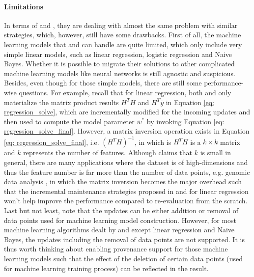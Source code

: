 \paragraph{Limitations} In terms of \cite{deshpande2006mauvedb} and \cite{gupta2015processing}, they are dealing with almost the same problem with similar strategies, which, however, still have some drawbacks. First of all, the machine learning models that \cite{deshpande2006mauvedb} and \cite{gupta2015processing} can handle are quite limited, which only include very simple linear models, such as linear regression, logistic regression and Naive Bayes. Whether it is possible to migrate their solutions to other complicated machine learning models like neural networks is still agnostic and suspicious. Besides, even though for those simple models, there are still some performance-wise questions. For example, recall that for linear regression, both \cite{deshpande2006mauvedb} and \cite{gupta2015processing} only materialize the matrix product results $H^TH$ and $H^T\bar{y}$ in Equation \ref{eq: regression_solve}, which are incrementally modified for the incoming updates and then used to compute the model parameter $\bar{w}^*$ by invoking Equation \ref{eq: regression_solve_final}. However, a matrix inversion operation exists in Equation \ref{eq: regression_solve_final}, i.e. $(H^TH)^{-1}$, in which is $H^TH$ is a $k\times k$ matrix and $k$ represents the number of features. Although \cite{deshpande2006mauvedb} claims that $k$ is small in general, there are many applications where the dataset is of high-dimensions and thus the feature number is far more than the number of data points, e.g. genomic data analysis \cite{buhlmann2011statistics}, in which the matrix inversion becomes the major overhead such that the incremental maintenance strategies proposed in \cite{deshpande2006mauvedb} and \cite{gupta2015processing} for linear regression won't help improve the performance compared to re-evaluation from the scratch. Last but not least, note that the updates can be either addition or removal of data points used for machine learning model construction. However, for most machine learning algorithms dealt by \cite{deshpande2006mauvedb} and \cite{gupta2015processing} except linear regression and Naive Bayes, the updates including the removal of data points are not supported. It is thus worth thinking about enabling provenance support \cite{cheney2009provenance} for those machine learning models such that the effect of the deletion of certain data points (used for machine learning training process) can be reflected in the result.

